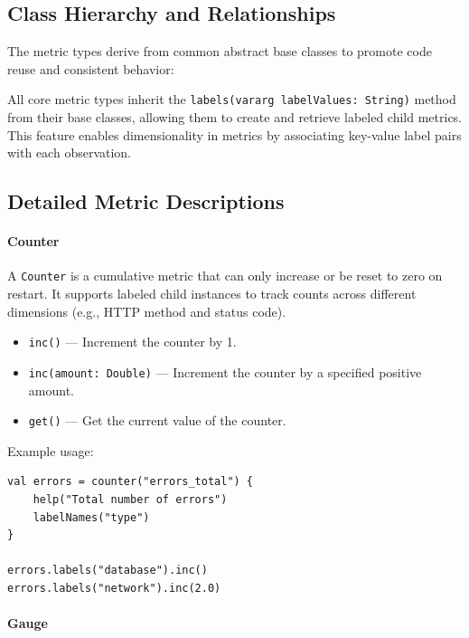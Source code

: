 \subsection{Class Hierarchy and Relationships}\label{subsec:class-hierarchy-and-relationships}

The metric types derive from common abstract base classes to promote code reuse and consistent behavior:

All core metric types inherit the \texttt{labels(vararg labelValues: String)} method from their base classes, allowing them to create and retrieve labeled child metrics.
This feature enables dimensionality in metrics by associating key-value label pairs with each observation.

\subsection{Detailed Metric Descriptions}\label{subsec:detailed-metric-descriptions}

\paragraph{Counter}

A \texttt{Counter} is a cumulative metric that can only increase or be reset to zero on restart.
It supports labeled child instances to track counts across different dimensions (e.g., HTTP method and status code).

\begin{itemize}
    \item \texttt{inc()} — Increment the counter by 1.
    \item \texttt{inc(amount: Double)} — Increment the counter by a specified positive amount.
    \item \texttt{get()} — Get the current value of the counter.
\end{itemize}

Example usage:

\begin{lstlisting}
val errors = counter("errors_total") {
    help("Total number of errors")
    labelNames("type")
}

errors.labels("database").inc()
errors.labels("network").inc(2.0)
\end{lstlisting}

\paragraph{Gauge}

